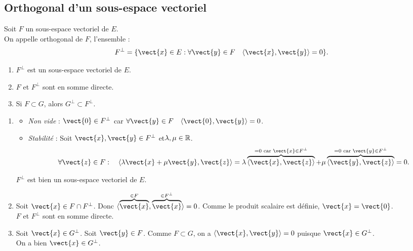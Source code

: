 \documentclass{book}
\begin{document}
\subsection{Orthogonal d'un sous-espace vectoriel}
\begin{Definition}
Soit $F$ un sous-espace vectoriel de $E$.\\
On appelle orthogonal de $F$, l'ensemble :
$$F^{\perp}=\{ \vect{x}\in E : \forall \vect{y}\in F \quad \PS{\vect{x}}{\vect{y}}=0 \}. $$ 
  \centering
{}

\end{Definition}
\begin{Proposition}
\begin{enumerate}
\item $F^{\perp}$ est un sous-espace vectoriel de $E$.
\item $F$ et $F^{\perp}$ sont en somme directe.
 \item Si $F\subset G$, alors $G^{\perp}\subset F^{\perp}.$ 
\end{enumerate}
\end{Proposition}
\begin{Demonstration}
\begin{enumerate}
\item 
\begin{itemize}
\item \textit{Non vide} : $\vect{0}\in F^{\perp}$ car  $\forall \vect{y}\in F \quad \PS{\vect{0}}{\vect{y}}=0$.
\item  \textit{Stabilité} : Soit $\vect{x},\vect{y}\in F^{\perp}$ et$\lambda,\mu\in\mathbb{R}$.
$$\forall \vect{z}\in F:  \quad \PS{\lambda\vect{x}+\mu \vect{y}}{\vect{z}}=\lambda\overbrace{\PS{\vect{x}}{\vect{z}}}^{=0\text{ car }\vect{x}\in F^{\perp}}+\mu\overbrace{\PS{ \vect{y}}{\vect{z}}}^{=0\text{ car }\vect{y}\in F^{\perp}}=0.$$
\end{itemize}
$F^{\perp}$ est bien un sous-espace vectoriel de $E$.
\item  
Soit $\vect{x}\in F\cap F^{\perp}$.  Donc $\PS{\overbrace{\vect{x}}^{\in F}}{\overbrace{\vect{x}}^{\in F^{\perp}}}=0$. Comme le produit scalaire est définie,  $\vect{x}=\vect{0}$.\\
$F$ et $F^{\perp}$ sont en somme directe.
\item Soit $\vect{x}\in G^{\perp}$. Soit $\vect{y}\in F$. Comme $F\subset G$, on a  $\PS{\vect{x}}{\vect{y}}=0$ puisque $\vect{x}\in G^{\perp}$. \\
On a bien $\vect{x}\in G^{\perp}$.
\end{enumerate}
\end{Demonstration}
\end{document}
